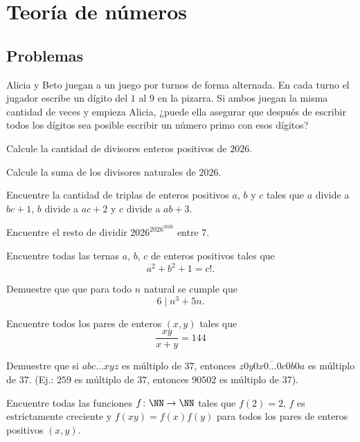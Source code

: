 \chapter{Teoría de números}

\section{Problemas}
\begin{problem}
Alicia y Beto juegan a un juego
por turnos de forma alternada.
En cada turno el jugador
escribe un dígito del $1$
al $9$ en la pizarra.
Si ambos juegan la misma cantidad de veces
y empieza Alicia,
¿puede ella asegurar que después
de escribir todos los dígitos
sea posible escribir un número primo
con esos dígitos?
\end{problem}

\begin{problem}
Calcule la cantidad de divisores enteros positivos de $2026$.
\end{problem}

\begin{problem}
Calcule la suma de los divisores naturales de $2026$.
\end{problem}

\begin{problem}
Encuentre la cantidad de triplas de enteros positivos $a$, $b$ y $c$ tales que $a$ divide a $bc + 1$, $b$ divide
a $ac + 2$ y $c$ divide a $ab + 3$.
\end{problem}

\begin{problem}
Encuentre el resto de dividir $2026^{2026^{2026}}$ entre $7$.
\end{problem}

\begin{problem}
Encuentre todas las ternas $a$, $b$, $c$ de enteros positivos
tales que
\[a^2 + b^2 + 1 = c!.\]
\end{problem}

\begin{problem}
Demuestre que que para todo $n$ natural se cumple que
\[6 \mid n^3 + 5n.\]
\end{problem}

\begin{problem}
Encuentre todos los pares de enteros $\left(x, y\right)$ tales que
\[\frac{xy}{x + y} = 144\]
\end{problem}

\begin{problem}[CAM JT 2025]
Demuestre que si $\overline{abc\dots{x}yz}$ es múltiplo de $37$,
entonces $\overline{z0y0x0\dots0c0b0a}$ es múltiplo de 37.
(Ej.: $259$ es múltiplo de $37$, entonces $90502$ es múltiplo de 37).
\end{problem}

\begin{problem}
Encuentre todas las funciones $f\colon\NN\to\NN$ tales que $f(2) = 2$, $f$
es estrictamente creciente y $f(xy) = f(x)f(y)$ para todos los pares de
enteros positivos $(x, y)$.
\end{problem}
